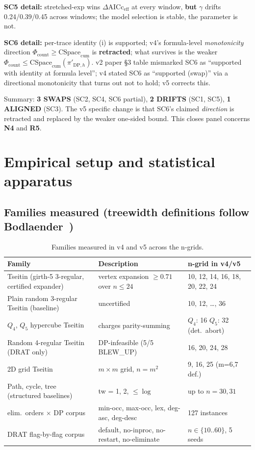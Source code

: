 \documentclass[11pt,a4paper]{article}
\theoremstyle{remark}
\begin{document}
\textbf{SC5 detail:} stretched-exp wins $\Delta$AICc$_{\mathrm{eff}}$ at
every window, \textbf{but} $\gamma$ drifts 0.24/0.39/0.45 across windows;
the model selection is stable, the parameter is not.

\textbf{SC6 detail:} per-trace identity (i) is supported; v4's
formula-level \emph{monotonicity} direction $\Phi_{\mathrm{count}} \ge
\mathrm{CSpace}_{\mathrm{cum}}$ is \textbf{retracted}; what survives is
the weaker $\Phi_{\mathrm{count}} \le
\mathrm{CSpace}_{\mathrm{cum}}(\pi'_{\mathrm{DP},h})$. v2 paper \S3 table
mismarked SC6 as ``supported with identity at formula level''; v4 stated
SC6 as ``supported (swap)'' via a directional monotonicity that turns
out not to hold; v5 corrects this.

Summary: \textbf{3 SWAPS} (SC2, SC4, SC6 partial), \textbf{2 DRIFTS}
(SC1, SC5), \textbf{1 ALIGNED} (SC3). The v5 specific change is that
SC6's claimed \emph{direction} is retracted and replaced by the weaker
one-sided bound. This closes panel concerns \textbf{N4} and \textbf{R5}.

\section{Empirical setup and statistical apparatus}

\subsection{Families measured (treewidth definitions follow Bodlaender~\cite{Bodlaender1998})}

\begin{table}[H]
\centering
\small
\begin{tabularx}{\textwidth}{@{}>{\raggedright\arraybackslash}p{4.0cm} X X@{}}
\toprule
Family & Description & n-grid in v4/v5 \\
\midrule
Tseitin (girth-5 3-regular, certified expander) & vertex expansion $\ge
0.71$ over $n \le 24$ & 10, 12, 14, 16, 18, 20, 22, 24 \\
Plain random 3-regular Tseitin (baseline) & uncertified & 10, 12, \ldots, 36 \\
$Q_4$, $Q_5$ hypercube Tseitin & charges parity-summing & \makecell[tl]{$Q_4$: 16\\$Q_5$: 32 (det.\ abort)} \\
Random 4-regular Tseitin (DRAT only) & DP-infeasible (5/5 BLEW\_UP) &
16, 20, 24, 28 \\
2D grid Tseitin & $m \times m$ grid, $n = m^2$ & 9, 16, 25 (m=6,7 def.) \\
Path, cycle, tree (structured baselines) & tw = 1, 2, $\le \log$ & up to
$n = 30, 31$ \\
5 elim.~orders $\times$ DP corpus & min-occ, max-occ, lex, deg-asc,
deg-desc & 127 instances \\
DRAT flag-by-flag corpus & default, no-inproc, no-restart,
no-eliminate & $n \in \{10..60\}$, 5 seeds \\
\bottomrule
\end{tabularx}
\caption{Families measured in v4 and v5 across the n-grids.}
\label{tab:families}
\end{table}
\end{document}
